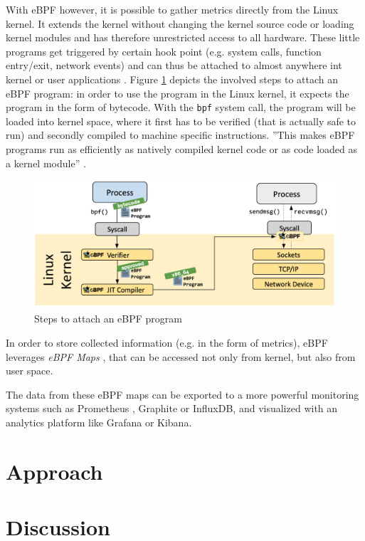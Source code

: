 \documentclass[lettersize,journal]{IEEEtran}
\begin{document}
With eBPF \cite{ebpf} however, it is possible to gather metrics directly from the Linux kernel. It extends the kernel without changing the kernel source code or loading kernel modules and has therefore unrestricted access to all hardware. These little programs get triggered by certain hook point (e.g. system calls, function entry/exit, network events) and can thus be attached to almost anywhere int kernel or user applications \cite{whatebpf}. 
Figure \ref{fig:ebpf:steps} depicts the involved steps to attach an eBPF program: in order to use the program in the Linux kernel, it expects the program in the form of bytecode. With the \texttt{bpf} system call, the program will be loaded into kernel space, where it first has to be verified (that is actually safe to run) and secondly compiled to machine specific instructions. ''This makes eBPF programs run as efficiently as natively compiled kernel code or as code loaded as a kernel module'' \cite{whatebpf}.
\begin{figure}[h]
	\includegraphics[width=\linewidth]{images/ebpf-steps.png}
	\caption{Steps to attach an eBPF program \cite{whatebpf}}
	\label{fig:ebpf:steps}
\end{figure}
In order to store collected information (e.g. in the form of metrics), eBPF leverages \textit{eBPF Maps} \cite{ebpfMaps}, that can be accessed not only from kernel, but also from user space.

The data from these eBPF maps can be exported to a more powerful monitoring systems such as Prometheus \cite{prometheus}, Graphite or InfluxDB, and  visualized with an analytics platform like Grafana or Kibana.

\section{Approach}

\section{Discussion}
\end{document}
